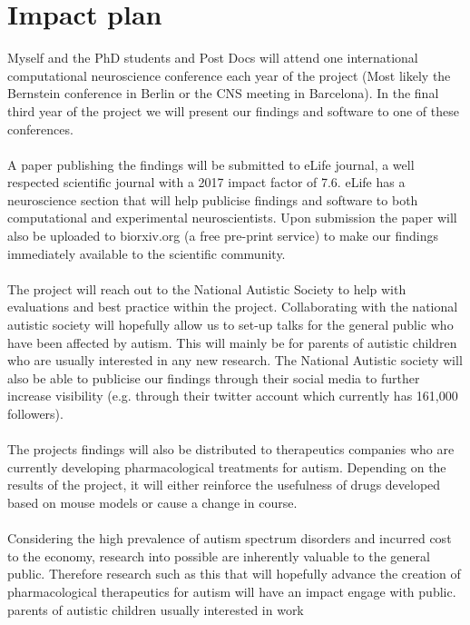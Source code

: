 \documentclass{epsrc}
\begin{document}
\part{Impact plan}
\noindent
Myself and the PhD students and Post Docs will attend one international computational neuroscience conference each year of the project (Most likely the Bernstein conference in Berlin or the CNS meeting in Barcelona). In the final third year of the project we will present our findings and software to one of these conferences. 
\\\\
A paper publishing the findings will be submitted to eLife journal, a well respected scientific journal with a 2017 impact factor of 7.6. eLife has a neuroscience section that will help publicise findings and software to both computational and experimental neuroscientists. Upon submission the paper will also be uploaded to biorxiv.org (a free pre-print service) to make our findings immediately available to the scientific community.
\\\\
The project will reach out to the National Autistic Society to help with evaluations and best practice within the project. Collaborating with the national autistic society will hopefully allow us to set-up talks for the general public who have been affected by autism. This will mainly be for parents of autistic children who are usually interested in any new research. The National Autistic society will also be able to publicise our findings through their social media to further increase visibility (e.g. through their twitter account which currently has 161,000 followers).
\\\\
The projects findings will also be distributed to therapeutics companies who are currently developing pharmacological treatments for autism. Depending on the results of the project, it will either reinforce the usefulness of drugs developed based on mouse models or cause a change in course. 
 \\\\
Considering the high prevalence of autism spectrum disorders and incurred cost to the economy, research into possible are inherently valuable to the general public. Therefore research such as this that will hopefully advance the creation of pharmacological therapeutics for autism will have an impact 
engage with public. parents of autistic children usually interested in work
\end{document}
